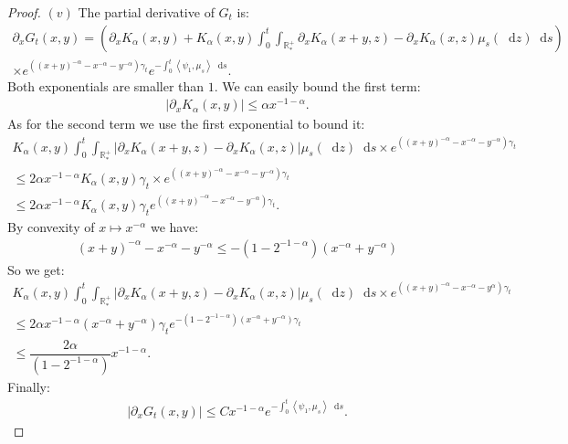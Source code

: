 \documentclass[11pt,a4paper]{article}
\newcommand{\RRP}{\mathbb{R}^+_*}
\newcommand{\brac}[1]{\left\langle#1\right\rangle}
\newcommand{\dd}{\mathop{}\!\mathrm{d}}
\begin{document}
\begin{proof}
    $(v)$ The partial derivative of $G_t$ is:
    \begin{multline*}
        \partial_x G_t(x,y) = \left(\partial_x K_\alpha(x,y) + K_\alpha(x,y) \int_0^t \int_{\RRP} \partial_x K_\alpha(x+y,z) - \partial _x K_\alpha(x,z)\mu_s(\dd z)\dd s\right)\\
        \times e^{\left((x+y)^{-\alpha} - x^{-\alpha}- y^{-\alpha}\right)\gamma_t} e^{-\int_0^t \brac{\psi_1,\mu_s}\dd s}.
    \end{multline*}
    Both exponentials are smaller than $1$. We can easily bound the first term:
    \begin{align*}
        \left| \partial_x K_\alpha(x,y) \right| \leq \alpha x^{-1-\alpha}.
    \end{align*}
    As for the second term we use the first exponential to bound it:
    \begin{multline*}
         K_\alpha(x,y) \int_0^t \int_{\RRP} \left|\partial_x K_\alpha(x+y,z) - \partial _x K_\alpha(x,z)\right|\mu_s(\dd z)\dd s\times  e^{\left((x+y)^{-\alpha} - x^{-\alpha}- y^{-\alpha}\right)\gamma_t}\\
         \leq 2 \alpha  x^{-1-\alpha} K_\alpha(x,y)\gamma_t \times e^{\left((x+y)^{-\alpha} - x^{-\alpha}- y^{-\alpha}\right)\gamma_t}\\
         \leq 2 \alpha  x^{-1-\alpha} K_\alpha(x,y)\gamma_t e^{\left((x+y)^{-\alpha} - x^{-\alpha}- y^{-\alpha}\right)\gamma_t} .
    \end{multline*}
    By convexity of $x\mapsto x^{-\alpha}$ we have:
    \begin{align*}
        (x+y)^{-\alpha} - x^{-\alpha}- y^{-\alpha} \leq -(1-2^{-1-\alpha})(x^{-\alpha} + y^{-\alpha})
    \end{align*}
    So we get:
    \begin{align*}
        K_\alpha(x,y) \int_0^t \int_{\RRP} \left|\partial_x K_\alpha(x+y,z) - \partial _x K_\alpha(x,z)\right|\mu_s(\dd z)\dd s\times  e^{\left((x+y)^{-\alpha} - x^{-\alpha}- y^\alpha\right)\gamma_t}\\
        \leq 2 \alpha  x^{-1-\alpha} (x^{-\alpha} + y^{-\alpha})\gamma_t e^{-(1-2^{-1-\alpha})(x^{-\alpha} + y^{-\alpha})\gamma_t} \\
        \leq \dfrac{2\alpha}{(1-2^{-1-\alpha})}  x^{-1-\alpha}.
    \end{align*}
    Finally:
    \begin{align*}
        \left|\partial_x G_t(x,y)\right| \leq C x^{-1-\alpha} e^{-\int_0^t \brac{\psi_1,\mu_s}\dd s}.
    \end{align*}


\end{proof}
\end{document}

